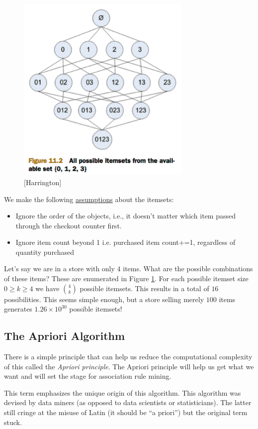 \documentclass[a4paper]{article}
\begin{document}
\begin{figure}
\centering
\includegraphics[width=0.75\textwidth]{FullItemsetHierarchy.png}
\caption{\label{fig:allItemsets}[Harrington] }
\end{figure}

We make the following \underline{assumptions} about the itemsets:
\begin{itemize}
\item Ignore the order of the objects, i.e., it doesn't matter which item passed through the checkout counter first.
\item Ignore item count beyond 1 i.e. purchased item count+=1, regardless of quantity purchased 
\end{itemize}

Let's say we are in a store with only $4$ items.  What are the possible combinations of these items?   These are enumerated in Figure \ref{fig:allItemsets}. For each possible itemset size $0\geq k\geq4$ we have $\binom{4}{k}$ possible itemsets. This results in a total of $16$ possibilities.
This seems simple enough, but a store selling merely $100$ items generates $1.26\times 10^{30}$ possible itemsets!

\subsection{The Apriori Algorithm}

There is a simple principle that can help us reduce the computational complexity of this called the \textit{Apriori principle}. The Apriori principle  will help us get what we want and will set the stage for association rule mining.
\par
This term emphasizes the unique origin of this algorithm. This algorithm was devised by data miners (as opposed to data scientists or statisticians). The latter still cringe at the misuse of Latin (it should be ``a priori'') but the original term stuck.
\end{document}
